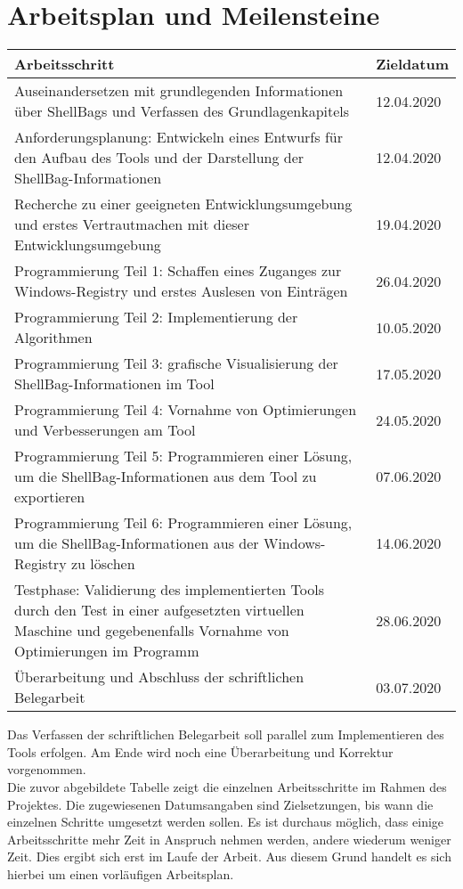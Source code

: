 \section{Arbeitsplan und Meilensteine}

\begin{longtable}{|p{}|p{}|}
	
	\hline
	\cellcolor{gray!25}\textbf{Arbeitsschritt} & \cellcolor{gray!25}\textbf{Zieldatum} \\
	\hline
	Auseinandersetzen mit grundlegenden Informationen über ShellBags und Verfassen des Grundlagenkapitels & 12.04.2020 \\
	\hline
	Anforderungsplanung: Entwickeln eines Entwurfs für den Aufbau des Tools und der Darstellung der ShellBag-Informationen & 12.04.2020  \\
	\hline
	Recherche zu einer geeigneten Entwicklungsumgebung und erstes Vertrautmachen mit dieser Entwicklungsumgebung & 19.04.2020 \\
	\hline
	Programmierung Teil 1: Schaffen eines Zuganges zur Windows-Registry und erstes Auslesen von Einträgen & 26.04.2020 \\
	\hline
	Programmierung Teil 2: Implementierung der Algorithmen & 10.05.2020 \\
	\hline
	Programmierung Teil 3: grafische Visualisierung der ShellBag-Informationen im Tool & 17.05.2020 \\
	\hline
	Programmierung Teil 4: Vornahme von Optimierungen und Verbesserungen am Tool  & 24.05.2020 \\
	\hline
	Programmierung Teil 5: Programmieren einer Lösung, um die ShellBag-Informationen aus dem Tool zu exportieren & 07.06.2020 \\
	\hline
	Programmierung Teil 6: Programmieren einer Lösung, um die ShellBag-Informationen aus der Windows-Registry zu löschen & 14.06.2020 \\
	\hline
	Testphase: Validierung des implementierten Tools durch den Test in einer aufgesetzten virtuellen Maschine und gegebenenfalls Vornahme von Optimierungen im Programm & 28.06.2020 \\
	\hline
	Überarbeitung und Abschluss der schriftlichen Belegarbeit & 03.07.2020 \\
	\hline
\end{longtable}

Das Verfassen der schriftlichen Belegarbeit soll parallel zum Implementieren des Tools erfolgen. Am Ende wird noch eine Überarbeitung und Korrektur vorgenommen. \\
Die zuvor abgebildete Tabelle zeigt die einzelnen Arbeitsschritte im Rahmen des Projektes. Die zugewiesenen Datumsangaben sind Zielsetzungen, bis wann die einzelnen Schritte umgesetzt werden sollen. Es ist durchaus möglich, dass einige  Arbeitsschritte mehr Zeit in Anspruch nehmen werden, andere wiederum weniger Zeit. Dies ergibt sich erst im Laufe der Arbeit. Aus diesem Grund handelt es sich hierbei um einen vorläufigen Arbeitsplan.
\vspace{1em}
